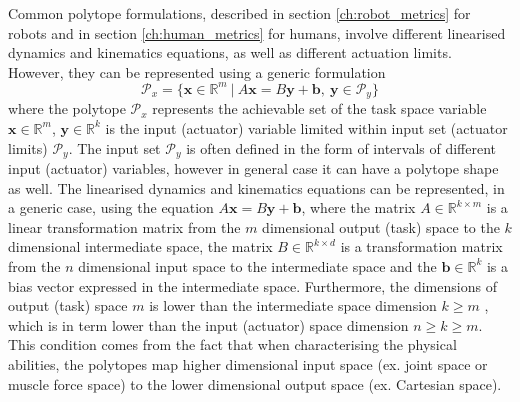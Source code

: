 Common polytope formulations, described in section \ref{ch:robot_metrics} for robots and in section \ref{ch:human_metrics} for humans, involve different linearised dynamics and kinematics equations, as well as different actuation limits. However, they can be represented using a generic formulation
\begin{equation}
    \mathcal{P}_x = \{\bm{x}\in\mathbb{R}^m ~|~ A\bm{x}=B\bm{y} + \bm{b}, ~ \bm{y}\in\mathcal{P}_y\}
    \label{eq:generic_polyt_view}
\end{equation}
where the polytope $\mathcal{P}_x$ represents the achievable set of the task space variable $\bm{x}\in\mathbb{R}^m$, $\bm{y}\in\mathbb{R}^k$ is the input (actuator) variable limited within input set (actuator limits) $\mathcal{P}_y$. The input set $\mathcal{P}_y$ is often defined in the form of intervals of different input (actuator) variables, however in general case it can have a polytope shape as well. The linearised dynamics and kinematics equations can be represented, in a generic case, using the equation $A\bm{x}\!=\!B\bm{y}\!+\!\bm{b}$, where the matrix $A\in\mathbb{R}^{k\times m}$ is a linear transformation matrix from the $m$ dimensional output (task) space to the $k$ dimensional intermediate space, the matrix $B\in\mathbb{R}^{k\times d}$ is a transformation matrix from the $n$ dimensional input space to the intermediate space and the $\bm{b}\in\mathbb{R}^k$ is a bias vector expressed in the intermediate space. Furthermore, the dimensions of output (task) space $m$ is lower than the intermediate space dimension $k\!\geq\! m$ , which is in term lower than the input (actuator) space dimension $n\!\geq\! k\!\geq\! m$. This condition comes from the fact that when characterising the physical abilities, the polytopes map higher dimensional input space (ex. joint space or muscle force space) to the lower dimensional output space (ex. Cartesian space).

